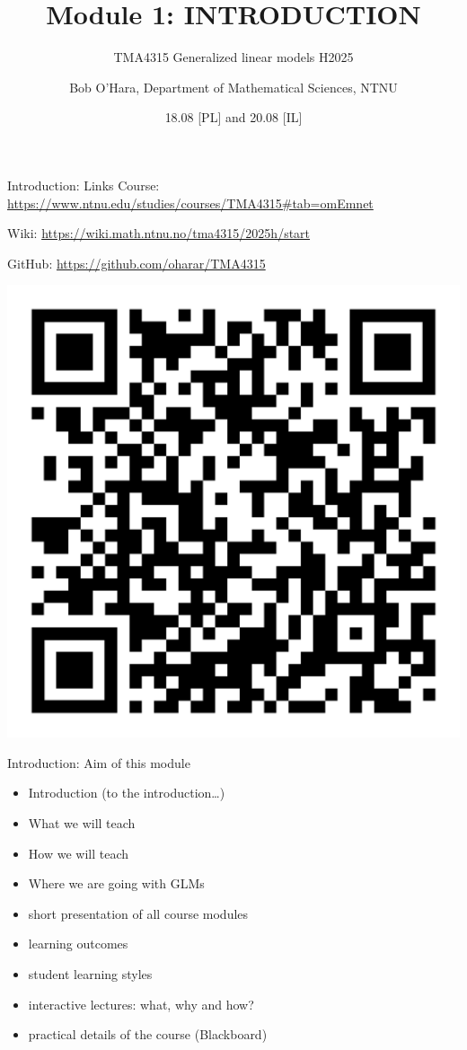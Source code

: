 \documentclass[
  ignorenonframetext,
]{beamer}
\title{Module 1: INTRODUCTION}
\subtitle{TMA4315 Generalized linear models H2025}
\author{Bob O'Hara, Department of Mathematical Sciences, NTNU}
\date{18.08 {[}PL{]} and 20.08 {[}IL{]}}
\begin{document}
\frame{\titlepage}

\begin{frame}{Introduction: Links}
\label{introduction-links}
Course: \url{https://www.ntnu.edu/studies/courses/TMA4315\#tab=omEmnet}

Wiki: \url{https://wiki.math.ntnu.no/tma4315/2025h/start}

GitHub: \url{https://github.com/oharar/TMA4315}

\includegraphics[width=\linewidth,height=0.4\textheight,keepaspectratio]{WikiTMA4315_2025.png}
\end{frame}

\begin{frame}{Introduction: Aim of this module}
\label{introduction-aim-of-this-module}
\begin{itemize}
\item
  Introduction (to the introduction\ldots)
\item
  What we will teach
\item
  How we will teach
\item
  Where we are going with GLMs
\item
  short presentation of all course modules
\item
  learning outcomes
\item
  student learning styles
\item
  interactive lectures: what, why and how?
\item
  practical details of the course (Blackboard)
\end{itemize}
\end{frame}
\end{document}
